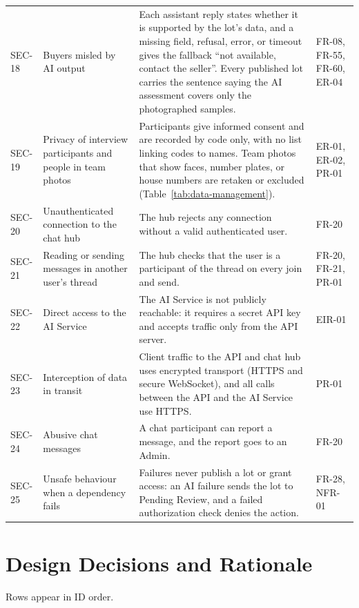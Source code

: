 {\begin{longtable}{@{}>{\raggedright\arraybackslash}p{}>{\raggedright\arraybackslash}p{}>{\raggedright\arraybackslash}p{}>{\raggedright\arraybackslash}p{}@{}}
SEC-18 & Buyers misled by AI output & Each assistant reply states whether it is supported by the lot's data, and a missing field, refusal, error, or timeout gives the fallback ``not available, contact the seller''. Every published lot carries the sentence saying the AI assessment covers only the photographed samples. & FR-08, FR-55, FR-60, ER-04 \\
SEC-19 & Privacy of interview participants and people in team photos & Participants give informed consent and are recorded by code only, with no list linking codes to names. Team photos that show faces, number plates, or house numbers are retaken or excluded (Table~\ref{tab:data-management}). & ER-01, ER-02, PR-01 \\
SEC-20 & Unauthenticated connection to the chat hub & The hub rejects any connection without a valid authenticated user. & FR-20 \\
SEC-21 & Reading or sending messages in another user's thread & The hub checks that the user is a participant of the thread on every join and send. & FR-20, FR-21, PR-01 \\
SEC-22 & Direct access to the AI Service & The AI Service is not publicly reachable: it requires a secret API key and accepts traffic only from the API server. & EIR-01 \\
SEC-23 & Interception of data in transit & Client traffic to the API and chat hub uses encrypted transport (HTTPS and secure WebSocket), and all calls between the API and the AI Service use HTTPS. & PR-01 \\
SEC-24 & Abusive chat messages & A chat participant can report a message, and the report goes to an Admin. & FR-20 \\
SEC-25 & Unsafe behaviour when a dependency fails & Failures never publish a lot or grant access: an AI failure sends the lot to Pending Review, and a failed authorization check denies the action. & FR-28, NFR-01 \\
\bottomrule
\end{longtable}
}

\section{Design Decisions and Rationale}

Rows appear in ID order.

